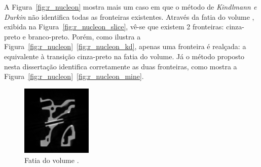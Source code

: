 A Figura~\ref{fig:r_nucleon} mostra mais um caso em que o método de \textit{Kindlmann e Durkin} não identifica todas as fronteiras existentes. Através da fatia do volume , exibida na Figura~\ref{fig:r_nucleon_slice}, vê-se que existem 2 fronteiras: cinza-preto e branco-preto. Porém, como ilustra a Figura~\ref{fig:r_nucleon}~\ref{fig:r_nucleon_kd}, apenas uma fronteira é realçada: a equivalente à transição cinza-preto na fatia do volume. Já o método proposto nesta dissertação identifica corretamente as duas fronteiras, como mostra a Figura~\ref{fig:r_nucleon}~\ref{fig:r_nucleon_mine}.
	
\begin{figure}[h]
	\centering
	\includegraphics[width=0.3\textwidth]{images/r_engine_slice}
	\caption{Fatia do volume .}
	\label{fig:r_engine_slice}
\end{figure}

